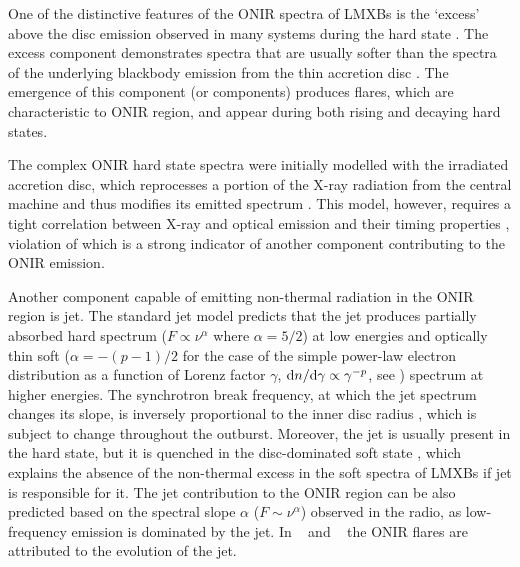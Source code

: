 One of the distinctive features of the \gls{ONIR} spectra of \glspl{LMXB} is the `excess' above the disc emission observed in many systems during the hard state \citep{Hynes2000, Jain2001,Buxton2004, Kalemci2013}.
The excess component demonstrates spectra that are usually softer than the spectra of the underlying blackbody emission from the thin accretion disc \citep{Shakura1973}.
The emergence of this component (or components) produces flares, which are characteristic to \gls{ONIR} region, and appear during both rising and decaying hard states.

The complex \gls{ONIR} hard state spectra were initially modelled with the irradiated accretion disc, which reprocesses a portion of the X-ray radiation from the central machine and thus modifies its emitted spectrum \citep[e.g., \XTEJxviii,][]{Gierlinski2009}.
This model, however, requires a tight correlation between X-ray and optical emission and their timing properties \citep{VanParadijs1994}, violation of which is a strong indicator of another component contributing to the \gls{ONIR} emission.

Another component capable of emitting non-thermal radiation in the \gls{ONIR} region is jet.
The standard jet model \citep{Blandford1979} predicts that the jet produces partially absorbed hard spectrum ($F\propto \nu^\alpha$ where $\alpha = 5/2$) at low energies and optically thin soft ($\alpha = -(p-1)/2$ for the case of the simple power-law electron distribution as a function of Lorenz factor $\gamma$, $\mathrm{d}n/\mathrm{d}\gamma \propto \gamma ^ {-p}$, see \citealt{RadiationProcesses}) spectrum at higher energies.
The synchrotron break frequency, at which the jet spectrum changes its slope, is inversely proportional to the inner disc radius \citep{Heinz2003}, which is subject to change throughout the outburst.
Moreover, the jet is usually present in the hard state, but it is quenched in the disc-dominated soft state \citep{Corbel2002}, which explains the absence of the non-thermal excess in the soft spectra of \glspl{LMXB} if jet is responsible for it.
The jet contribution to the \gls{ONIR} region can be also predicted based on the spectral slope $\alpha$ ($F\sim \nu^\alpha$) observed in the radio, as low-frequency emission is dominated by the jet.
In \ivU\ \citep{Kalemci2005} and \MAXIJxviii\ \citep{Russell2013} the \gls{ONIR} flares are attributed to the evolution of the jet.



